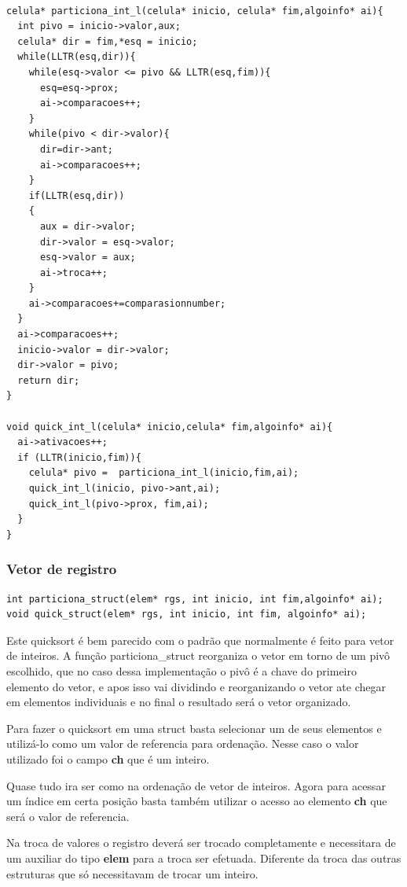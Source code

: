 \documentclass[11pt]{article}
\begin{document}
\begin{verbatim}

celula* particiona_int_l(celula* inicio, celula* fim,algoinfo* ai){
  int pivo = inicio->valor,aux;
  celula* dir = fim,*esq = inicio;
  while(LLTR(esq,dir)){
    while(esq->valor <= pivo && LLTR(esq,fim)){
      esq=esq->prox;
      ai->comparacoes++;
    }
    while(pivo < dir->valor){
      dir=dir->ant;
      ai->comparacoes++;
    }
    if(LLTR(esq,dir))
    {
      aux = dir->valor;
      dir->valor = esq->valor;
      esq->valor = aux;
      ai->troca++;
    }
    ai->comparacoes+=comparasionnumber;
  }
  ai->comparacoes++;
  inicio->valor = dir->valor;
  dir->valor = pivo;
  return dir;
}

void quick_int_l(celula* inicio,celula* fim,algoinfo* ai){
  ai->ativacoes++;
  if (LLTR(inicio,fim)){
    celula* pivo =  particiona_int_l(inicio,fim,ai);
    quick_int_l(inicio, pivo->ant,ai);
    quick_int_l(pivo->prox, fim,ai);
  }
}
\end{verbatim}
\subsubsection{Vetor de registro}
\label{sec:org1d39db1}
\begin{verbatim}
int particiona_struct(elem* rgs, int inicio, int fim,algoinfo* ai);
void quick_struct(elem* rgs, int inicio, int fim, algoinfo* ai);
\end{verbatim}

Este quicksort é bem parecido com o padrão que normalmente é feito para vetor de inteiros. A função particiona\_struct reorganiza o vetor em torno de um pivô escolhido, que no caso dessa implementação o pivô é a chave do primeiro elemento do vetor, e apos isso vai dividindo e reorganizando o vetor ate chegar em elementos individuais e no final o resultado será o vetor organizado.

Para fazer o quicksort em uma struct basta selecionar um de seus elementos e utilizá-lo como um valor de referencia para ordenação. Nesse caso o valor utilizado foi o campo \textbf{ch} que é um inteiro.

Quase tudo ira ser como na ordenação de vetor de inteiros. Agora para acessar um índice em certa posição basta também utilizar o acesso ao elemento \textbf{ch} que será o valor de referencia.

Na troca de valores o registro deverá ser trocado completamente e necessitara de um auxiliar do tipo \textbf{elem} para a troca ser efetuada. Diferente da troca das outras estruturas que só necessitavam de trocar um inteiro.
\end{document}
